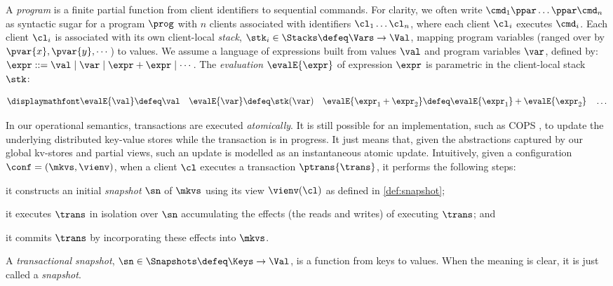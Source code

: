 A {\em program} is a finite partial function from client identifiers to sequential
commands.
For clarity, we often write \( \cmd_{1}\ppar \dots \ppar \cmd_{n}\) as syntactic sugar 
for a program \( \prog \) with $n$ clients associated with identifiers
$\cl_1 \dots \cl_n$, where each client $\cl_i$ executes
$\cmd_i$. 
Each client $\cl_i$ is associated with its own client-local \emph{stack}, 
$\stk_i \in \Stacks \defeq \Vars \to \Val$,  mapping program variables
(ranged over by $\pvar{x}, \pvar{y}, \cdots$)
to values. 
We assume a language of expressions built from values \( \val \)
and program variables \( \var \), defined by:
$\expr ::= \val \mid \var \mid \expr + \expr \mid \cdots$.
The \emph{evaluation} $\evalE{\expr}$ of expression $\expr$ is parametric in
the client-local stack \( \stk \):%

\spaceshrink{-5pt}
{%
\[
\displaymathfont
\begin{gathered}
\evalE{\val} \defeq
\val
\quad
\evalE{\var} \defeq
\stk(\var)
\quad
\evalE{\expr_{1} + \expr_{2}} \defeq
\evalE{\expr_{1}} + \evalE{\expr_{2}}
\quad
\dots
\end{gathered}%
\]
}%

In our operational semantics, transactions are executed
\emph{atomically}. It is still possible for an
implementation, such as COPS \cite{cops}, 
to update the underlying distributed key-value stores while
the transaction is in progress. It just means that, given the
abstractions captured by our global kv-stores and partial views, 
such an update is modelled as  an instantaneous  atomic
update.
Intuitively, given a configuration $\conf = (\mkvs, \vienv)$, 
when a client $\cl$ executes a transaction $\ptrans{\trans}$, 
it performs the following steps: 
\begin{enumerate*}
	\item it constructs an initial \emph{snapshot} $\sn$ of $\mkvs$ using its view $\vienv(\cl)$ as defined in \cref{def:snapshot};  
	\item it executes $\trans$ in isolation over $\sn$
        accumulating the effects (the reads and writes) of executing $\trans$; and
	\item it commits $\trans$ by incorporating these effects into $\mkvs$.
\end{enumerate*}

\spaceshrink{-3pt}
\begin{definition}
\label{def:heaps}
A \emph{transactional snapshot}, \( \sn \in \Snapshots \defeq \Keys \to
\Val\),  is a function from keys to values. When the meaning is clear,
it is just called a {\em snapshot}. 
\end{definition}
\spaceshrink{-3pt}

